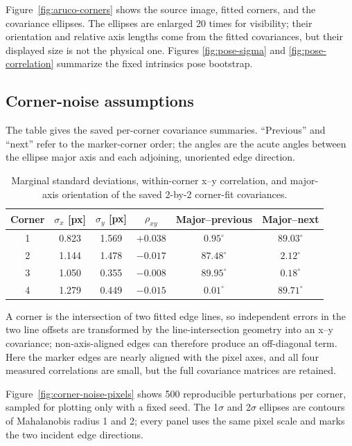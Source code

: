 \documentclass[11pt]{article}
\begin{document}
Figure~\ref{fig:aruco-corners} shows the source image, fitted corners, and
the covariance ellipses. The ellipses are enlarged 20 times for visibility;
their orientation and relative axis lengths come from the fitted
covariances, but their displayed size is not the physical one. Figures
\ref{fig:pose-sigma} and \ref{fig:pose-correlation} summarize the fixed
intrinsics pose bootstrap.

\subsection{Corner-noise assumptions}

The table gives the saved per-corner covariance summaries. “Previous” and
“next” refer to the marker-corner order; the angles are the acute angles
between the ellipse major axis and each adjoining, unoriented edge direction.
\begin{table}[htbp]
  \centering
  \small
  \begin{tabular}{c c c c c c}
    \toprule
    Corner & \(\sigma_x\) [px] & \(\sigma_y\) [px] & \(\rho_{xy}\) &
    Major--previous & Major--next \\
    \midrule
    1 & 0.823 & 1.569 & \(+0.038\) & \(0.95^\circ\) & \(89.03^\circ\) \\
    2 & 1.144 & 1.478 & \(-0.017\) & \(87.48^\circ\) & \(2.12^\circ\) \\
    3 & 1.050 & 0.355 & \(-0.008\) & \(89.95^\circ\) & \(0.18^\circ\) \\
    4 & 1.279 & 0.449 & \(-0.015\) & \(0.01^\circ\) & \(89.71^\circ\) \\
    \bottomrule
  \end{tabular}
  \caption{Marginal standard deviations, within-corner x--y correlation, and
  major-axis orientation of the saved 2-by-2 corner-fit covariances.}
  \label{tab:corner-covariance}
\end{table}

A corner is the intersection of two fitted edge lines, so independent errors
in the two line offsets are transformed by the line-intersection geometry
into an x--y covariance; non-axis-aligned edges can therefore produce an
off-diagonal term. Here the marker edges are nearly aligned with the pixel
axes, and all four measured correlations are small, but the full covariance
matrices are retained.

Figure~\ref{fig:corner-noise-pixels} shows 500 reproducible perturbations per
corner, sampled for plotting only with a fixed seed. The 1\(\sigma\) and
2\(\sigma\) ellipses are contours of Mahalanobis radius 1 and 2; every panel
uses the same pixel scale and marks the two incident edge directions.
\end{document}
